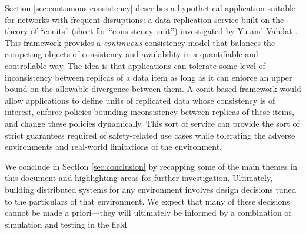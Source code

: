 \documentclass[]             %
{NASA}                       %
\theoremstyle{definition}
\begin{document}
Section \ref{sec:continuous-consistency} describes a hypothetical
application suitable for networks with frequent disruptions: a data
replication service built on the theory of ``conits'' (short for
``consistency unit'') investigated by Yu and Vahdat
\cite{2002tact}. This framework provides a \emph{continuous}
consistency model that balances the competing objects of consistency
and availability in a quantifiable and controllable way. The idea is
that applications can tolerate some level of inconsistency between
replicas of a data item as long as it can enforce an upper bound on
the allowable divergence between them. A conit-based framework would
allow applications to define units of replicated data whose
consistency is of interest, enforce policies bounding inconsistency
between replicas of these items, and change these policies
dynamically. This sort of service can provide the sort of strict
guarantees required of safety-related use cases while tolerating the
adverse environments and real-world limitations of the environment.

We conclude in Section \ref{sec:conclusion} by recapping some of the
main themes in this document and highlighting areas for further
investigation. Ultimately, building distributed systems for any
environment involves design decisions tuned to the particulars of that
environment. We expect that many of these decisions cannot be made a
priori---they will ultimately be informed by a combination of
simulation and testing in the field.

\end{document}
